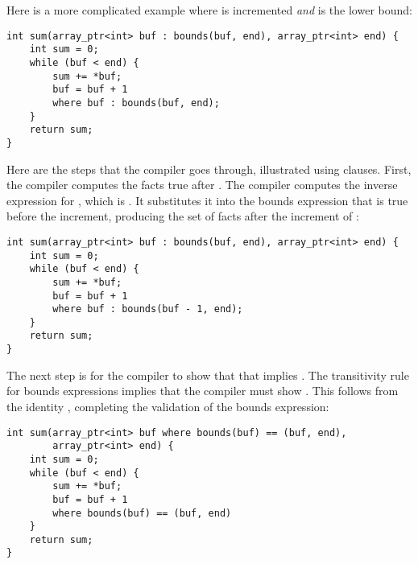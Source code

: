 Here is a more complicated example where  is incremented
\emph{and}  is the lower bound:

\begin{lstlisting}
int sum(array_ptr<int> buf : bounds(buf, end), array_ptr<int> end) {
    int sum = 0;
    while (buf < end) {
        sum += *buf;   
        buf = buf + 1
        where buf : bounds(buf, end);
    }
    return sum;
}
\end{lstlisting}

Here are the steps that the compiler goes through, illustrated using 
 clauses. First, the compiler computes the facts true after
. The compiler computes the inverse expression for
, which is . It substitutes it into the
bounds expression that is true before the increment, producing the set
of facts after the increment of 
:

\begin{lstlisting}
int sum(array_ptr<int> buf : bounds(buf, end), array_ptr<int> end) {
    int sum = 0;
    while (buf < end) {
        sum += *buf;   
        buf = buf + 1
        where buf : bounds(buf - 1, end); 
    }
    return sum;
}
\end{lstlisting}

The next step is for the compiler to show that that  implies . The
transitivity rule for bounds expressions implies that the compiler must
show . This follows from the
identity  \code{-}  \code{<} ,
completing the validation of the bounds expression:

\begin{lstlisting}
int sum(array_ptr<int> buf where bounds(buf) == (buf, end), 
        array_ptr<int> end) {
    int sum = 0;
    while (buf < end) {
        sum += *buf;   
        buf = buf + 1
        where bounds(buf) == (buf, end) 
    }
    return sum;
}
\end{lstlisting}